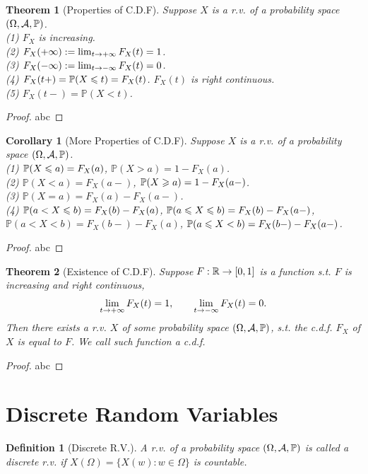 \documentclass[openany,12pt]{book}
\newtheorem{theorem}{Theorem}[chapter]
\newtheorem{corollary}{Corollary}[chapter]
\newtheorem{definition}{Definition}[chapter]
\begin{document}
\begin{theorem}[Properties of C.D.F]
  Suppose $X$ is a r.v. of a probability space $(\Omega,\mathcal{A},\mathbb{P})$.\\
  (1) $F_X$ is increasing.\\
  (2) $F_X(+\infty):= \lim_{t\to+\infty} F_X(t)=1$.\\
  (3) $F_X(-\infty):= \lim_{t\to-\infty} F_X(t)=0$.\\
  (4) $F_X(t+)=\mathbb{P}(X\leqslant t)=F_X(t)$. $F_X(t)$ is right continuous.\\
  (5) $F_X(t-)=\mathbb{P}(X<t)$.
\end{theorem}

\begin{proof}
  abc
\end{proof}

\begin{corollary}[More Properties of C.D.F]
  Suppose $X$ is a r.v. of a probability space $(\Omega,\mathcal{A},\mathbb{P})$.\\
  (1) $\mathbb{P}(X\leqslant a)=F_X(a)$, $\mathbb{P}(X>a)=1-F_X(a)$.\\
  (2) $\mathbb{P}(X<a)=F_X(a-)$, $\mathbb{P}(X\geqslant a)=1-F_X(a-)$.\\
  (3) $\mathbb{P}(X=a)=F_X(a)-F_X(a-)$.\\
  (4) $\mathbb{P}(a<X\leqslant b)=F_X(b)-F_X(a)$, $ \mathbb{P}(a\leqslant X\leqslant b)=F_X(b)-F_X(a-)$, $\mathbb{P}(a<X<b)=F_X(b-)-F_X(a)$, $\mathbb{P}(a\leqslant X<b)=F_X(b-)-F_X(a-)$.
\end{corollary}

\begin{proof}
  abc
\end{proof}

\begin{theorem}[Existence of C.D.F]
  Suppose $F: \mathbb{R}\to[0,1]$ is a function s.t. $F$ is increasing and right continuous,
  $$\lim_{t\to+\infty} F_X(t)=1,\qquad\lim_{t\to-\infty} F_X(t)=0.$$
  Then there exists a r.v. $X$ of some probability space $(\Omega,\mathcal{A},\mathbb{P})$,
  s.t. the c.d.f. $F_X$ of $X$ is equal to $F$. We call such function a c.d.f.
\end{theorem}

\begin{proof}
  abc
\end{proof}

\section{Discrete Random Variables}

\begin{definition}[Discrete R.V.]
  A r.v. of a probability space $(\Omega,\mathcal{A},\mathbb{P})$ is called a discrete r.v. if $X(\Omega)=\{X(w):w\in\Omega\}$ is countable.
\end{definition}
\end{document}
